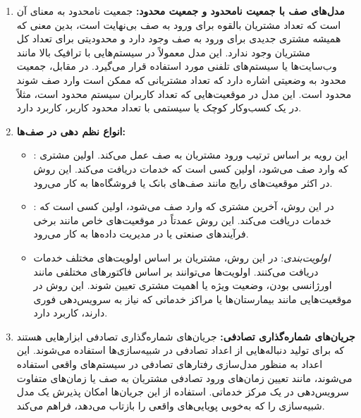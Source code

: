 \begin{enumerate}
	\item \textbf{مدل‌های صف با جمعیت نامحدود و جمعیت محدود:}
	جمعیت نامحدود به معنای آن است که تعداد مشتریان بالقوه برای ورود به صف بی‌نهایت است، بدین معنی که همیشه مشتری جدیدی برای ورود به صف وجود دارد و محدودیتی برای تعداد کل مشتریان وجود ندارد. این مدل معمولاً در سیستم‌هایی با ترافیک بالا مانند وب‌سایت‌ها یا سیستم‌های تلفنی مورد استفاده قرار می‌گیرد. در مقابل، جمعیت محدود به وضعیتی اشاره دارد که تعداد مشتریانی که ممکن است وارد صف شوند محدود است. این مدل در موقعیت‌هایی که تعداد کاربران سیستم محدود است، مثلاً در یک کسب‌وکار کوچک یا سیستمی با تعداد محدود کاربر، کاربرد دارد.
	
	\item \textbf{انواع نظم دهی در صف‌ها:}
	\begin{itemize}
		\item \textit{}: این رویه بر اساس ترتیب ورود مشتریان به صف عمل می‌کند. اولین مشتری که وارد صف می‌شود، اولین کسی است که خدمات دریافت می‌کند. این روش در اکثر موقعیت‌های رایج مانند صف‌های بانک یا فروشگاه‌ها به کار می‌رود.
		\item \textit{}: در این روش، آخرین مشتری که وارد صف می‌شود، اولین کسی است که خدمات دریافت می‌کند. این روش عمدتاً در موقعیت‌های خاص مانند برخی فرآیندهای صنعتی یا در مدیریت داده‌ها به کار می‌رود.
		\item \textit{اولویت‌بندی}: در این روش، مشتریان بر اساس اولویت‌های مختلف خدمات دریافت می‌کنند. اولویت‌ها می‌توانند بر اساس فاکتورهای مختلفی مانند اورژانسی بودن، وضعیت ویژه یا اهمیت مشتری تعیین شوند. این روش در موقعیت‌هایی مانند بیمارستان‌ها یا مراکز خدماتی که نیاز به سرویس‌دهی فوری دارند، کاربرد دارد.
	\end{itemize}
	
	\item \textbf{جریان‌های شماره‌گذاری تصادفی:}
	جریان‌های شماره‌گذاری تصادفی ابزارهایی هستند که برای تولید دنباله‌هایی از اعداد تصادفی در شبیه‌سازی‌ها استفاده می‌شوند. این اعداد به منظور مدل‌سازی رفتارهای تصادفی در سیستم‌های واقعی استفاده می‌شوند، مانند تعیین زمان‌های ورود تصادفی مشتریان به صف یا زمان‌های متفاوت سرویس‌دهی در یک مرکز خدماتی. استفاده از این جریان‌ها امکان پذیرش یک مدل شبیه‌سازی را که به‌خوبی پویایی‌های واقعی را بازتاب می‌دهد، فراهم می‌کند.
\end{enumerate}